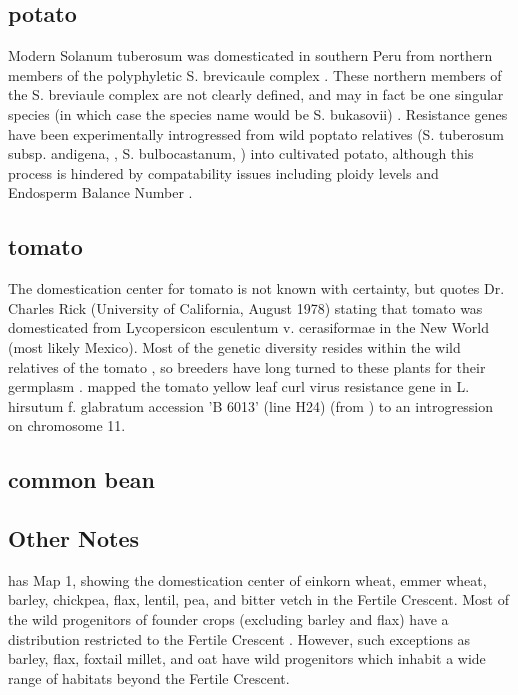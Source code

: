 \documentclass[11pt]{article}
\begin{document}
{\subsection*{potato}

Modern Solanum tuberosum was domesticated in southern Peru from northern members of the polyphyletic S. brevicaule complex \cite{spooner2005single}.
These northern members of the S. breviaule complex are not clearly defined, and may in fact be one singular species (in which case the species name would be S. bukasovii) \cite{spooner2005single}.
Resistance genes have been experimentally introgressed from wild poptato relatives (S. tuberosum subsp. andigena, \cite{van1999tight}, S. bulbocastanum, \cite{van2003ancient}) into cultivated potato, although this process is hindered by compatability issues including ploidy levels and Endosperm Balance Number \cite{johnston1980significance}.

\subsection*{tomato}

The domestication center for tomato is not known with certainty, but \cite{sims1979history} quotes Dr. Charles Rick (University of California, August 1978) stating that tomato was domesticated from Lycopersicon esculentum v. cerasiformae in the New World (most likely Mexico).
Most of the genetic diversity resides within the wild relatives of the tomato \cite{rick1988tomato} \cite{miller1990rflp}, so breeders have long turned to these plants for their germplasm \cite{rick1982potential}.
\cite{hanson2000mapping} mapped the tomato yellow leaf curl virus resistance gene in L. hirsutum f. glabratum accession 'B 6013' (line H24) (from \cite{banerjee1990transfer}) to an introgression on chromosome 11.

\subsection*{common bean}

\subsection*{Other Notes}

\cite{zohary2012domestication} has Map 1, showing the domestication center of einkorn wheat, emmer wheat, barley, chickpea, flax, lentil, pea, and bitter vetch in the Fertile Crescent.
Most of the wild progenitors of founder crops (excluding barley and flax) have a distribution restricted to the Fertile Crescent \cite{zohary2012domestication}.
However, such exceptions as barley, flax, foxtail millet, and oat have wild progenitors which inhabit a wide range of habitats beyond the Fertile Crescent.

}
\end{document}
